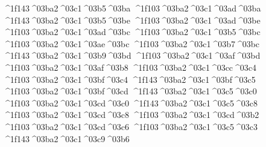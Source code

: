 {	^^^^1f143^^^^03ba2^^^^03c1^^^^03b5^^^^03ba		%
	^^^^1f103^^^^03ba2^^^^03c1^^^^03ad^^^^03ba
	^^^^1f143^^^^03ba2^^^^03c1^^^^03b5^^^^03be 		%
	^^^^1f103^^^^03ba2^^^^03c1^^^^03ad^^^^03be 
	^^^^1f103^^^^03ba2^^^^03c1^^^^03ad^^^^03bc		%
	^^^^1f103^^^^03ba2^^^^03c1^^^^03b5^^^^03bc
	^^^^1f103^^^^03ba2^^^^03c1^^^^03ae^^^^03bc		%
	^^^^1f103^^^^03ba2^^^^03c1^^^^03b7^^^^03bc
	^^^^1f143^^^^03ba2^^^^03c1^^^^03b9^^^^03bd		%
	^^^^1f103^^^^03ba2^^^^03c1^^^^03af^^^^03bd
	^^^^1f103^^^^03ba2^^^^03c1^^^^03af^^^^03b8
	^^^^1f103^^^^03ba2^^^^03c1^^^^03cc^^^^03c4		%
	^^^^1f103^^^^03ba2^^^^03c1^^^^03bf^^^^03c4
	^^^^1f143^^^^03ba2^^^^03c1^^^^03bf^^^^03c5		%
	^^^^1f103^^^^03ba2^^^^03c1^^^^03bf^^^^03cd
	^^^^1f143^^^^03ba2^^^^03c1^^^^03c5^^^^03c0  		%
	^^^^1f103^^^^03ba2^^^^03c1^^^^03cd^^^^03c0 		%
	^^^^1f143^^^^03ba2^^^^03c1^^^^03c5^^^^03c8
	^^^^1f103^^^^03ba2^^^^03c1^^^^03cd^^^^03c8
	^^^^1f103^^^^03ba2^^^^03c1^^^^03cd^^^^03b2
	^^^^1f103^^^^03ba2^^^^03c1^^^^03cd^^^^03c6
	^^^^1f103^^^^03ba2^^^^03c1^^^^03c5^^^^03c3  		%
	^^^^1f143^^^^03ba2^^^^03c1^^^^03c9^^^^03b6  		%
}
